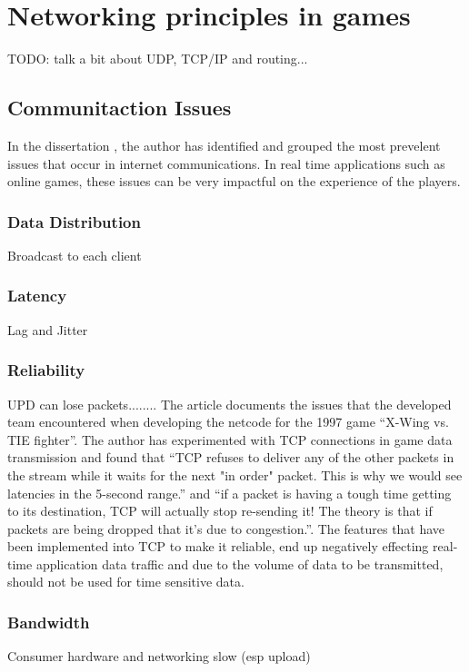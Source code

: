 \section{Networking principles in games}
TODO: talk a bit about UDP, TCP/IP and routing...

\subsection{Communitaction Issues}

In the dissertation , the author has identified and grouped the most prevelent issues that occur in internet communications. In real time applications such as online games, these issues can be very impactful on the experience of the players.

\subsubsection{Data Distribution}
Broadcast to each client

\subsubsection{Latency}
Lag and Jitter

\subsubsection{Reliability}
UPD can lose packets........ The article  documents the issues that the developed team encountered when developing the netcode for the 1997 game ``X-Wing vs. TIE fighter''. The author has experimented with TCP connections in game data transmission and found that ``TCP refuses to deliver any of the other packets in the stream while it waits for the next "in order" packet. This is why we would see latencies in the 5-second range.'' and ``if a packet is having a tough time getting to its destination, TCP will actually stop re-sending it! The theory is that if packets are being dropped that it's due to congestion.''. The features that have been implemented into TCP to make it reliable, end up negatively effecting real-time application data traffic and due to the volume of data to be transmitted, should not be used for time sensitive data.

\subsubsection{Bandwidth}
Consumer hardware and networking slow (esp upload)



